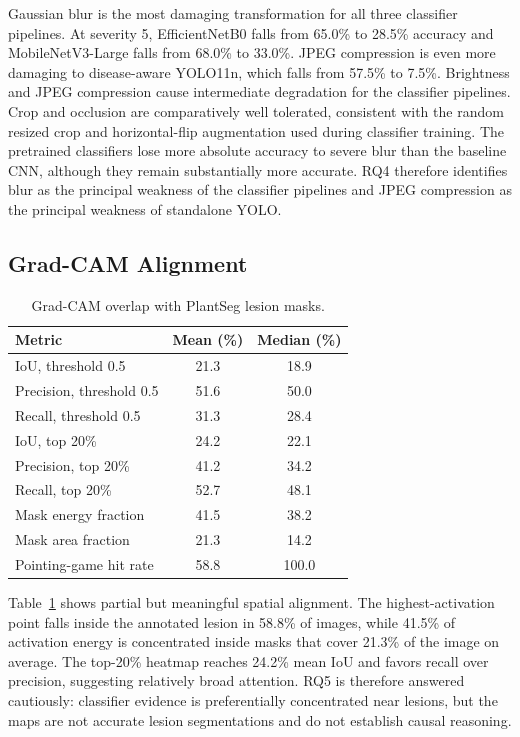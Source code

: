 \documentclass[conference]{IEEEtran}
\begin{document}
Gaussian blur is the most damaging transformation for all three classifier pipelines. At severity
5, EfficientNetB0 falls from 65.0\% to 28.5\% accuracy and MobileNetV3-Large falls from 68.0\% to
33.0\%. JPEG compression is even more damaging to disease-aware YOLO11n, which falls from 57.5\%
to 7.5\%. Brightness and JPEG compression cause intermediate degradation for the classifier
pipelines. Crop and occlusion are comparatively well
tolerated, consistent with the random resized crop and horizontal-flip augmentation used during
classifier training. The pretrained classifiers lose more absolute accuracy to severe blur than
the baseline CNN, although they remain substantially more accurate. RQ4 therefore identifies blur
as the principal weakness of the classifier pipelines and JPEG compression as the principal
weakness of standalone YOLO.

\subsection{Grad-CAM Alignment}

\begin{table}[t]
\caption{Grad-CAM overlap with PlantSeg lesion masks.}
\label{tab:gradcam-results}
\centering
\begin{tabular}{lcc}
\toprule
Metric & Mean (\%) & Median (\%) \\
\midrule
IoU, threshold 0.5 & 21.3 & 18.9 \\
Precision, threshold 0.5 & 51.6 & 50.0 \\
Recall, threshold 0.5 & 31.3 & 28.4 \\
IoU, top 20\% & 24.2 & 22.1 \\
Precision, top 20\% & 41.2 & 34.2 \\
Recall, top 20\% & 52.7 & 48.1 \\
Mask energy fraction & 41.5 & 38.2 \\
Mask area fraction & 21.3 & 14.2 \\
Pointing-game hit rate & 58.8 & 100.0 \\
\bottomrule
\end{tabular}
\end{table}

Table~\ref{tab:gradcam-results} shows partial but meaningful spatial alignment. The
highest-activation point falls inside the annotated lesion in 58.8\% of images, while 41.5\% of
activation energy is concentrated inside masks that cover 21.3\% of the image on average. The
top-20\% heatmap reaches 24.2\% mean IoU and favors recall over precision, suggesting relatively
broad attention. RQ5 is therefore answered cautiously: classifier evidence is preferentially
concentrated near lesions, but the maps are not accurate lesion segmentations and do not establish
causal reasoning.
\end{document}
